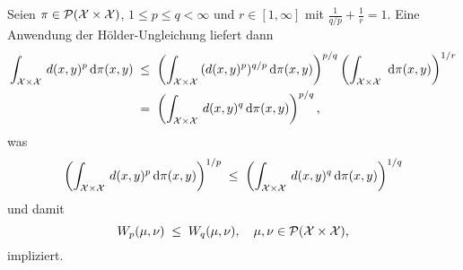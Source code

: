 \documentclass[../thesis/thesis.tex]{subfiles}
\begin{document}
	\begin{Bemerkung}
		Seien $\pi \in \mathcal{P}(\mathcal{X} \times \mathcal{X})$, $1 \leq p \leq q < \infty$ und $r \in [1, \infty]$ mit $\frac{1}{q/p} + \frac{1}{r} = 1$. Eine Anwendung der Hölder-Ungleichung liefert dann
		\begin{align*}
			\int_{\mathcal{X} \times \mathcal{X}} \, d(x, y)^p \, \mathrm{d}\pi(x, y) \; &\leq \; \left( \int_{\mathcal{X} \times \mathcal{X}} \, (d(x, y)^p)^{q/p} \, \mathrm{d}\pi(x, y) \right)^{p/q} \left( \int_{\mathcal{X} \times \mathcal{X}} \,  \, \mathrm{d}\pi(x, y) \right)^{1/r} \\
			                                                    &=    \; \left( \int_{\mathcal{X} \times \mathcal{X}} \, d(x, y)^q \, \mathrm{d}\pi(x, y) \right)^{p/q} \text{,}
		\end{align*}
		was
		\[ \left( \int_{\mathcal{X} \times \mathcal{X}} \, d(x, y)^p \, \mathrm{d}\pi(x, y) \right)^{1/p} \; \leq \; \left( \int_{\mathcal{X} \times \mathcal{X}} \, d(x, y)^q \, \mathrm{d}\pi(x, y) \right)^{1/q} \]
		und damit
		\[ W_p(\mu, \nu) \; \leq \; W_q(\mu, \nu), \quad \mu, \nu \in \mathcal{P}(\mathcal{X} \times \mathcal{X}) \text{,} \]
		impliziert.
	\end{Bemerkung}
\end{document}
